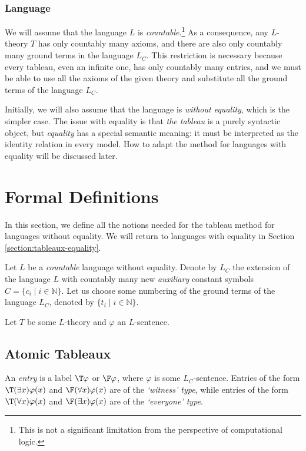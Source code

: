 \subsubsection{Language}

We will assume that the language $L$ is \emph{countable}.\footnote{This is not a significant limitation from the perspective of computational logic.} As a consequence, any $L$-theory $T$ has only countably many axioms, and there are also only countably many ground terms in the language $L_C$. This restriction is necessary because every tableau, even an infinite one, has only countably many entries, and we must be able to use all the axioms of the given theory and substitute all the ground terms of the language $L_C$.

Initially, we will also assume that the language is \emph{without equality}, which is the simpler case. The issue with equality is that \emph{the tableau} is a purely syntactic object, but \emph{equality} has a special semantic meaning: it must be interpreted as the identity relation in every model. How to adapt the method for languages with equality will be discussed later.

\section{Formal Definitions}

In this section, we define all the notions needed for the tableau method for languages without equality. We will return to languages with equality in Section \ref{section:tableaux-equality}.

Let $L$ be a \emph{countable} language without equality. Denote by $L_C$ the extension of the language $L$ with countably many new \emph{auxiliary} constant symbols $C=\{c_i\mid i\in \mathbb N\}$. Let us choose some numbering of the ground terms of the language $L_C$, denoted by $\{t_i\mid i\in\mathbb N\}$.

Let $T$ be some $L$-theory and $\varphi$ an $L$-sentence.

\subsection{Atomic Tableaux}

An \emph{entry} is a label $\T\varphi$ or $\F\varphi$, where $\varphi$ is some $L_C$-sentence. Entries of the form $\T(\exists x)\varphi(x)$ and $\F(\forall x)\varphi(x)$ are of the \emph{`witness' type}, while entries of the form $\T(\forall x)\varphi(x)$ and $\F(\exists x)\varphi(x)$ are of the \emph{`everyone' type}.

